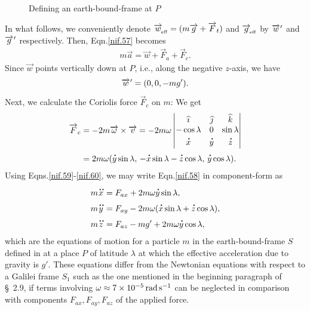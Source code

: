 \begin{figure}[H]
\begin{center}
  \end{center}
\caption{Defining an earth-bound-frame at $P$}
\label{fig2.5}
\end{figure}
In what follows, we conveniently denote 
$\vec{w}_\sfx{\text{eff}}=(m\vec{g}+\vec{F}_t)$ and 
$\vec{g}_\sfx{\text{eff}}$ by $\pvec{w}$ and $\pvec{g}$ 
respectively. Then, Eqn.\eqref{nif.57} becomes
\begin{align}\label{nif.58}
m \vec{a}= \vec{w} +\vec{F}_a +\vec{F}_c.
\end{align}
Since $\vec{w}$ points vertically down at $P$, i.e., along 
the negative $z$-axis, we have
\begin{align}\label{nif.59}
\pvec{w} = (0,0,-mg').
\end{align}
Next, we calculate the Coriolis force $\vec{F}_c$ on $m$:
We get
\begin{align}\label{nif.60}
\vec{F}_c&=-2m\vec{\gkw} \times \vec{v}=
-2m\gkw
\begin{vmatrix}
 \eye & \jay & \kay \\
 -\cos\lambda& 0&\sin\lambda\\
 \dot{x} & \dot{y} & \dot{z}
\end{vmatrix}\notag
\\&=2m\gkw(\dot{y}\sin\lambda,\,-\dot{x}
\sin\lambda
-\dot{z}\cos\lambda,\,\dot{y}\cos\lambda).
\end{align}
Using Eqns.\eqref{nif.59}-\eqref{nif.60}, we may write
Eqn.\eqref{nif.58} in component-form as
\begin{align}\label{nif.61}
m\ddot{x} & =F_{ax}+2m\gkw\dot{y}\sin\lambda,\\
m\ddot{y} & =F_{ay}-2m\gkw(\dot{x}\sin\lambda
+\dot{z}\cos\lambda),\label{nif.62}\\
m\ddot{z} & =F_{az}-mg'+2m\gkw\dot{y}\cos\lambda,
\label{nif.63}
\end{align}
which are the equations of motion for a particle $m$ 
in the earth-bound-frame $S$ defined in  
at a place $P$ of latitude $\lambda$ at which the 
effective acceleration due to gravity is $g'$. These 
equations differ from the Newtonian equations with 
respect to a Galilei frame $S_1$ such as the one 
mentioned in the beginning paragraph of \S~2.9, if 
terms involving $\gkw\approx 
\num{7d-5}\,\si{rad.s^{-1}}$ can be neglected in 
comparison with components $F_{ax},F_{ay},F_{az}$ of 
the applied force.

